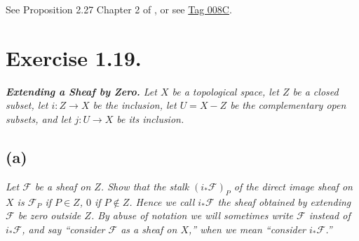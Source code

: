 See Proposition 2.27 Chapter 2 of \cite{gortz2020algebraic}, or see \href{https://stacks.math.columbia.edu/tag/008C}{Tag 008C}.


\section{Exercise 1.19.}\label{Hart Chap 2 Ex 1.19.}

\textit{\textbf{Extending a Sheaf by Zero.} Let $X$ be a topological space, let $Z$ be a closed subset, let $i:Z\to X$ be the inclusion, let $U=X-Z$ be the complementary open subsets, and let $j:U\to X$ be its inclusion.}

\subsection{(a)}
\textit{Let $\mathscr F$ be a sheaf on $Z$. Show that the stalk $(i_{\ast}\mathscr F)_P$ of the direct image sheaf on $X$ is $\mathscr F_P$ if $P\in Z$, $0$ if $P\notin Z$. Hence we call $i_{\ast}\mathscr F$ the sheaf obtained by extending $\mathscr F$ be zero outside $Z$. By abuse of notation we will sometimes write $\mathscr F$ instead of $i_{\ast}\mathscr F$, and say \enquote{consider $\mathscr F$ as a sheaf on $X$,} when we mean \enquote{consider $i_{\ast}\mathscr F$.}}
